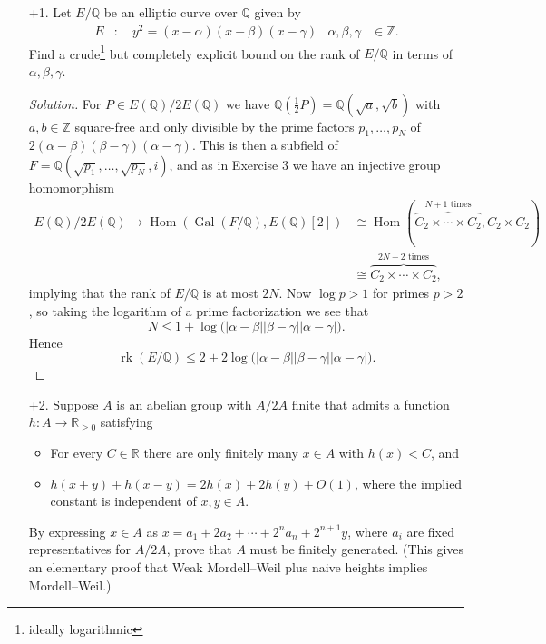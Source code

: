 \documentclass[a4paper]{article}
\theoremstyle{plain}
\theoremstyle{remark}
\theoremstyle{definition}
\DeclareMathOperator{\Hom}{Hom}
\DeclareMathOperator{\Gal}{Gal}
\DeclareMathOperator{\rk}{rk}
\newcommand{\Z}{\mathbb{Z}}
\newcommand{\Q}{\mathbb{Q}}
\newcommand{\R}{\mathbb{R}}
\begin{document}
\begin{enumerate}
    \item[+1.] Let $E/\Q$ be an elliptic curve over $\Q$ given by
        \begin{align*}
            E&:\quad y^2=(x-\alpha)(x-\beta)(x-\gamma) &
            \alpha,\beta,\gamma&\in\Z.
        \end{align*}
        Find a crude\footnote{ideally logarithmic} but completely explicit bound
        on the rank of $E/\Q$ in terms of $\alpha,\beta,\gamma$.

        \begin{proof}[Solution]
            For $P\in E(\Q)/2E(\Q)$ we have
            $\Q(\frac{1}{2}P)=\Q(\sqrt a,\sqrt b)$ with $a,b\in\Z$ square-free
            and only divisible by the prime factors $p_1,\ldots,p_N$ of
            $2(\alpha-\beta)(\beta-\gamma)(\alpha-\gamma)$. This is then a
            subfield of $F=\Q(\sqrt{p_1},\ldots,\sqrt{p_N},i)$, and as in
            Exercise 3 we have an injective group homomorphism
            \begin{align*}
                E(\Q)/2E(\Q) \to \Hom(\Gal(F/\Q),E(\Q)[2])
                    &\cong \Hom(\overbrace{C_2\times\cdots\times C_2}
                        ^{\text{$N+1$ times}},C_2\times C_2) \\
                    &\cong\overbrace{C_2\times\cdots\times C_2}
                        ^{\text{$2N+2$ times}},
            \end{align*}
            implying that the rank of $E/\Q$ is at most $2N$. Now $\log p>1$
            for primes $p>2$, so taking the logarithm of a prime factorization
            we see that
            \begin{equation*}
                N\le 1 + \log\bigl(
                    |\alpha-\beta||\beta-\gamma||\alpha-\gamma|\bigr).
            \end{equation*}
            Hence
            \begin{equation*}
                \rk(E/\Q)
                    \le 2+2\log\bigl(
                        |\alpha-\beta||\beta-\gamma||\alpha-\gamma|\bigr).
            \end{equation*}
        \end{proof}

    \item[+2.] Suppose $A$ is an abelian group with $A/2A$ finite that admits a
        function $h:A\to\R_{\ge0}$ satisfying
        \begin{itemize}
            \item For every $C\in\R$ there are only finitely many $x\in A$ with
                $h(x)<C$, and
            \item $h(x+y)+h(x-y)=2h(x)+2h(y)+O(1)$, where the implied constant
                is independent of $x,y\in A$.
        \end{itemize}
        By expressing $x\in A$ as $x=a_1+2a_2+\cdots+2^na_n+2^{n+1}y$, where
        $a_i$ are fixed representatives for $A/2A$, prove that $A$ must be
        finitely generated. (This gives an elementary proof that Weak
        Mordell--Weil plus naive heights implies Mordell--Weil.)


\end{enumerate}
\end{document}
